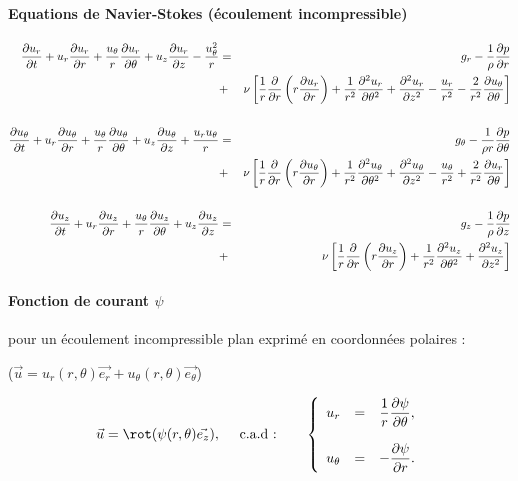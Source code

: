\paragraph{Equations de Navier-Stokes (écoulement incompressible)}

\begin{eqnarray*}
\frac {\partial u_r} {\partial t} + u_r \frac {\partial u_r} {\partial r} + \frac{u_{\theta}}{r} \frac {\partial u_r} {\partial \theta} + u_z \frac {\partial u_r} {\partial z} - \frac{u_{\theta}^2}{r} & = &
{ g_r} - \frac{1}{\rho} \frac {\partial p} {\partial r} \\
& + & \nu \left[ \frac{1}{r} \frac {\partial } {\partial r} \left( r \frac {\partial u_r} {\partial r} \right) + 
             \frac{1}{r^2} \frac {\partial^{2} u_r} {\partial \theta ^{2}} + \frac {\partial^{2} u_r} {\partial z ^{2}} -
             \frac{u_r}{r^2} - \frac{2}{r^2} \frac {\partial u_{\theta}} {\partial \theta} \right] \\
\\
\frac {\partial u_{\theta}} {\partial t} + u_r \frac {\partial u_{\theta}} {\partial r} + \frac{u_{\theta}}{r} \frac {\partial u_{\theta}} {\partial \theta} + u_z \frac {\partial u_{\theta}} {\partial z} + \frac{u_r u_{\theta}}{r} & = &
{ g_\theta} - \frac{1}{\rho r} \frac {\partial p} {\partial \theta} \\
& + & \nu \left[ \frac{1}{r} \frac {\partial } {\partial r} \left( r \frac {\partial u_{\theta}} {\partial r} \right) + 
             \frac{1}{r^2} \frac {\partial^{2} u_{\theta}} {\partial \theta ^{2}} + \frac {\partial^{2} u_{\theta}} {\partial z ^{2}} -
             \frac{u_{\theta}}{r^2} + \frac{2}{r^2} \frac {\partial u_r} {\partial \theta} \right] \\
\\
\frac {\partial u_z} {\partial t} + u_r \frac {\partial u_z} {\partial r} + \frac{u_{\theta}}{r} \frac {\partial u_z} {\partial \theta} + u_z \frac {\partial u_z} {\partial z} & = &
{ g_z }- \frac{1}{\rho} \frac {\partial p} {\partial z} \\
& + & \nu \left[ \frac{1}{r} \frac {\partial } {\partial r} \left( r \frac {\partial u_z} {\partial r} \right) + 
             \frac{1}{r^2} \frac {\partial^{2} u_z} {\partial \theta ^{2}} + \frac {\partial^{2} u_z} {\partial z ^{2}} \right]
\end{eqnarray*}


\paragraph{Fonction de courant $\psi$}  pour un écoulement incompressible plan exprimé en coordonnées polaires :

($\vec{u} = u_r(r,\theta) \vec{e_r} + u_\theta(r,\theta) \vec{e_\theta}$)


\begin{equation}
 \vec{u} = \rot (\psi(r,\theta) \vec{e_z}), 
\quad \mbox{ c.a.d :} \quad \quad 
\left\{
\begin{array}{ccc}
\displaystyle u_r &=& \displaystyle \frac{1}{r}\dpa{\psi}{\theta}, \\ \\
\displaystyle u_\theta &=&  \displaystyle -\dpa{\psi}{r}.
\end{array}
\right.
\end{equation}


